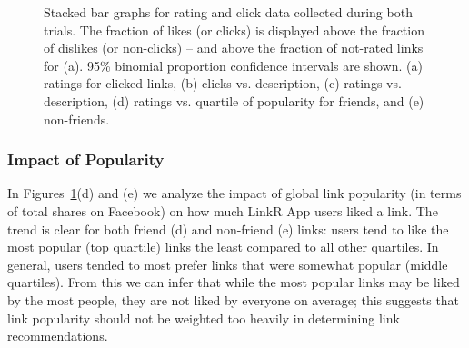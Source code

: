 \begin{figure}[t!]
\vspace{-3mm}
\caption{Stacked bar graphs for rating and click data collected during both
trials.  The fraction of likes (or clicks) is displayed above the
fraction of dislikes (or non-clicks) -- and above the fraction of
not-rated links for (a).  95\% binomial proportion confidence
intervals are shown.  (a) ratings for clicked links, (b) clicks vs. description, 
(c) ratings vs. description, (d) ratings vs. quartile of
popularity for friends, and (e) non-friends.}
\label{fig:click_evidence}
\end{figure}

\subsubsection{Impact of Popularity}

In Figures~\ref{fig:click_evidence}(d) and (e) we analyze the impact of
global link popularity (in terms of total shares on Facebook) on how
much LinkR App users liked a link.  The trend is clear for both friend
(d) and non-friend (e) links: users tend to like the most popular (top
quartile) links the least compared to all other quartiles.  In
general, users tended to most prefer links that were somewhat popular
(middle quartiles).  From this we can infer that while the most
popular links may be liked by the most people, they are not liked by
everyone on average; this suggests that link popularity should not be 
weighted too heavily in determining link recommendations.

